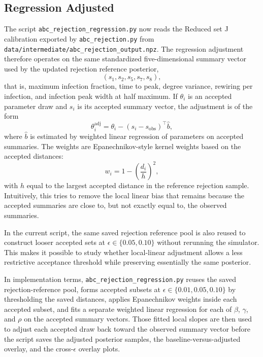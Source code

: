 \documentclass[11pt]{article}
\begin{document}
\subsection{Regression Adjusted}

The script \texttt{abc\_rejection\_regression.py} now reads the Reduced set J calibration exported by \texttt{abc\_rejection.py} from \texttt{data/intermediate/abc\_rejection\_output.npz}. The regression adjustment therefore operates on the same standardized five-dimensional summary vector used by the updated rejection reference posterior,
\[
(s_1,s_2,s_5,s_7,s_8),
\]
that is, maximum infection fraction, time to peak, degree variance, rewiring per infection, and infection peak width at half maximum. If $\theta_i$ is an accepted parameter draw and $s_i$ is its accepted summary vector, the adjustment is of the form
\[
\theta_i^{\text{adj}} = \theta_i - (s_i - s_{\text{obs}})^\top \widehat{b},
\]
where $\widehat{b}$ is estimated by weighted linear regression of parameters on accepted summaries. The weights are Epanechnikov-style kernel weights based on the accepted distances:
\[
w_i = 1 - \left(\frac{d_i}{h}\right)^2,
\]
with $h$ equal to the largest accepted distance in the reference rejection sample. Intuitively, this tries to remove the local linear bias that remains because the accepted summaries are close to, but not exactly equal to, the observed summaries.

In the current script, the same saved rejection reference pool is also reused to construct looser accepted sets at $\epsilon \in \{0.05,0.10\}$ without rerunning the simulator. This makes it possible to study whether local-linear adjustment allows a less restrictive acceptance threshold while preserving essentially the same posterior.

In implementation terms, \texttt{abc\_rejection\_regression.py} reuses the saved rejection-reference pool, forms accepted subsets at $\epsilon \in \{0.01,0.05,0.10\}$ by thresholding the saved distances, applies Epanechnikov weights inside each accepted subset, and fits a separate weighted linear regression for each of $\beta$, $\gamma$, and $\rho$ on the accepted summary vectors. Those fitted local slopes are then used to adjust each accepted draw back toward the observed summary vector before the script saves the adjusted posterior samples, the baseline-versus-adjusted overlay, and the cross-$\epsilon$ overlay plots.
\end{document}
